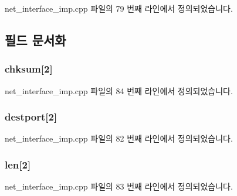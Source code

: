 net\+\_\+interface\+\_\+imp.\+cpp 파일의 79 번째 라인에서 정의되었습니다.



\subsection{필드 문서화}
\subsubsection[{\texorpdfstring{chksum}{chksum}}]{ chksum\mbox{[}2\mbox{]}}\hypertarget{structavdecc__lib_1_1udpheader_a607d4d558dca8536ef0828423bdf9e4c}{}\label{structavdecc__lib_1_1udpheader_a607d4d558dca8536ef0828423bdf9e4c}


net\+\_\+interface\+\_\+imp.\+cpp 파일의 84 번째 라인에서 정의되었습니다.

\subsubsection[{\texorpdfstring{destport}{destport}}]{ destport\mbox{[}2\mbox{]}}\hypertarget{structavdecc__lib_1_1udpheader_a50ec35685a2a3b99a37a1fa279844056}{}\label{structavdecc__lib_1_1udpheader_a50ec35685a2a3b99a37a1fa279844056}


net\+\_\+interface\+\_\+imp.\+cpp 파일의 82 번째 라인에서 정의되었습니다.

\subsubsection[{\texorpdfstring{len}{len}}]{ len\mbox{[}2\mbox{]}}\hypertarget{structavdecc__lib_1_1udpheader_a1f4db4ef2eda0f20fc4dd5cbff93c7be}{}\label{structavdecc__lib_1_1udpheader_a1f4db4ef2eda0f20fc4dd5cbff93c7be}


net\+\_\+interface\+\_\+imp.\+cpp 파일의 83 번째 라인에서 정의되었습니다.

